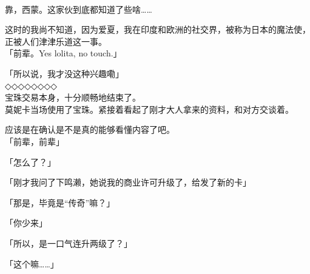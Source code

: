 \\

靠，西蒙。这家伙到底都知道了些啥……

这时的我尚不知道，因为爱夏，我在印度和欧洲的社交界，被称为日本的魔法使，正被人们津津乐道这一事。\\

「前辈。Yes lolita, no touch.」

「所以说，我才没这种兴趣嘞」\\

◇◇◇◇◇◇◇◇\\

宝珠交易本身，十分顺畅地结束了。\\

莫妮卡当场使用了宝珠。紧接着看起了刚才大人拿来的资料，和对方交谈着。

应该是在确认是不是真的能够看懂内容了吧。\\

「前辈，前辈」

「怎么了？」

「刚才我问了下鸣濑，她说我的商业许可升级了，给发了新的卡」

「那是，毕竟是“传奇”嘛？」

「你少来」

「所以，是一口气连升两级了？」

「这个嘛……」\\

